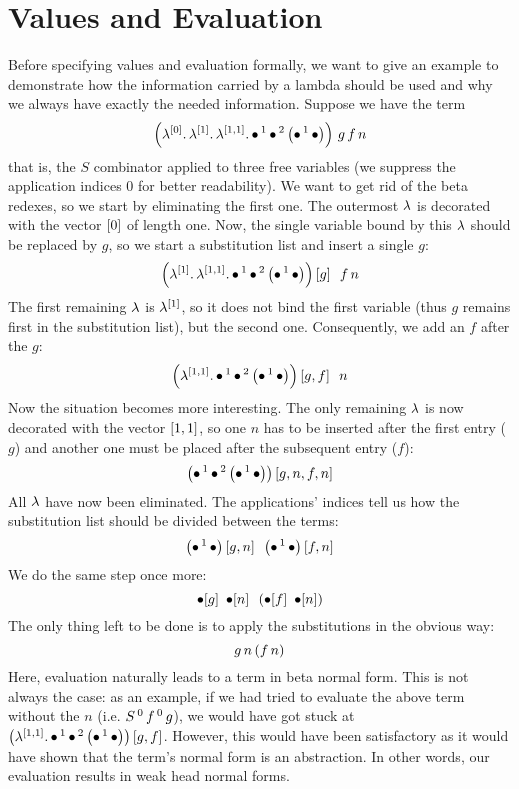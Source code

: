 \documentclass[submission,copyright,creativecommons]{eptcs}
\begin{document}
\section{Values and Evaluation} 
\label{sec:values}

Before specifying values and evaluation formally, we want to give an example to demonstrate how the information carried by a lambda should be used and why we always have exactly the needed information. Suppose we have the term
\[
\left(\lambda ^{[0]} . \, \lambda ^{[1]} . \, \lambda ^{[1,1]} . \, \mathord{\bullet} \, ^{1} \, \mathord{\bullet} \, ^{2} \, {\left( \mathord{\bullet} \, ^{1} \, \mathord{\bullet} \right)}\right) \, g \, f \, n 
\]
that is, the $S$ combinator applied to three free variables
(we suppress the application indices $0$ for better readability). We want to get rid of the beta redexes, so we start by eliminating the first one. The outermost $\lambda$ is decorated with the vector $[0]$ of length one. Now, the single variable bound by this $\lambda$ should be replaced by $g$, so we start a substitution list and insert a single $g$:
\[
\left(\lambda ^{[1]} . \, \lambda ^{[1,1]} . \, \mathord{\bullet} \, ^{1} \, \mathord{\bullet} \, ^{2} \, {\left( \mathord{\bullet} \, ^{1} \, \mathord{\bullet} \right)}\right) \left[ g \right] \ \, f \, n
\]
The first remaining $\lambda$ is $\lambda^{[1]}$, so it does not bind the first variable (thus $g$ remains first in the substitution list), but the second one. Consequently, we add an $f$ after the $g$:
\[
\left(\lambda ^{[1,1]} . \, \mathord{\bullet} \, ^{1} \, \mathord{\bullet} \, ^{2} \, {\left( \mathord{\bullet} \, ^{1} \, \mathord{\bullet} \right)}\right)  \left[ g, f \right] \ \, n
\]
Now the situation becomes more interesting. The only remaining $\lambda$ is now decorated with the vector $[1,1]$, so one $n$ has to be inserted after the first entry ($g$) and another one must be placed after the subsequent entry ($f$):
\[
\left(\mathord{\bullet} \, ^{1} \, \mathord{\bullet} \, ^{2} \, {\left( \mathord{\bullet} \, ^{1} \, \mathord{\bullet} \right)}\right)  \left[ g, n, f, n \right]
\]
All $\lambda$ have now been eliminated. The applications' indices tell us how the substitution list should be divided between the terms:
\[
\left(\mathord{\bullet} \, ^{1} \, \mathord{\bullet}\right)\left[ g, n \right] \ \, \left(\mathord{\bullet} \, ^{1} \, \mathord{\bullet}\right) \left[ f, n \right]
\]
We do the same step once more:
\[
\mathord{\bullet}[g]  \ \, \mathord{\bullet}[n]  \ \, \left(\mathord{\bullet}[f]  \ \, \mathord{\bullet}[n]\right)
\]
The only thing left to be done is to apply the substitutions in the obvious way:
\[
g \, n  \, (f \, n)
\]
Here, evaluation naturally leads to a term in beta normal form. This is not always the case: as an example, if we had tried to evaluate the above term without the $n$ (i.e. $S \, ^{0} \, f \, ^{0} \, g$), we would have got stuck at $\left(\lambda ^{[1,1]} . \, \mathord{\bullet} \, ^{1} \, \mathord{\bullet} \, ^{2} \, {\left( \mathord{\bullet} \, ^{1} \, \mathord{\bullet} \right)}\right)  \left[ g, f \right]$. However, this would have been satisfactory as it would have shown that the term's normal form is an abstraction. In other words, our evaluation results in weak head normal forms.
\end{document}
